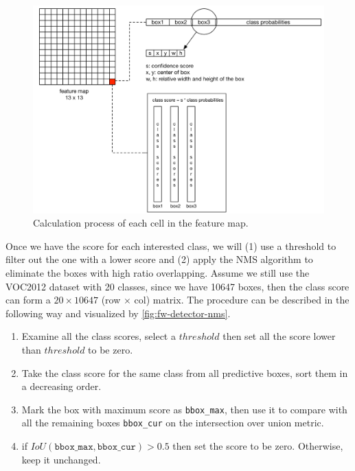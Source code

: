 \begin{figure}
    \includegraphics[width=\linewidth]{figures/framework_detector_calc.png}
    \caption{Calculation process of each cell in the feature map.}
    \label{fig:fw-detector-calc}
\end{figure}

Once we have the score for each interested class, we will (1) use a threshold to
filter out the one with a lower score and (2) apply the NMS algorithm to
eliminate the boxes with high ratio overlapping. Assume we still use the
VOC2012 dataset with 20 classes, since we have 10647 boxes, then the class score
can form a $20 \times 10647$ (row $\times$ col) matrix. The procedure can be
described in the following way and visualized by \autoref{fig:fw-detector-nms}.

\begin{enumerate}
    \item Examine all the class scores, select a $threshold$ then set all the
    score lower than $threshold$ to be zero.
    \item Take the class score for the same class from all predictive boxes,
    sort them in a decreasing order.
    \item Mark the box with maximum score as \texttt{bbox\_max}, then use it to
    compare with all the remaining boxes \texttt{bbox\_cur} on the intersection
    over union metric.
    \item if $IoU(\texttt{bbox\_max}, \texttt{bbox\_cur}) > 0.5$ then set the
    score to be zero. Otherwise, keep it unchanged.
\end{enumerate}

